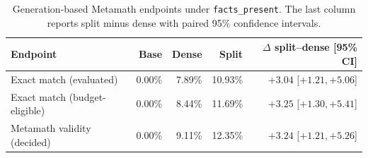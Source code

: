 \documentclass{article}
\begin{document}
\begin{table}[!htbp]
\centering
\scriptsize
\caption{Generation-based Metamath endpoints under \texttt{facts\_present}. The last column reports split minus dense with paired 95\% confidence intervals.}
\label{tab:p3-metamath}
\begin{tabular*}{\textwidth}{@{\extracolsep{\fill}}lrrrr}
\toprule
Endpoint & Base & Dense & Split & $\Delta$ split--dense [95\% CI] \\
\midrule
Exact match (evaluated)       & 0.00\% & 7.89\% & 10.93\% & $+3.04$ [$+1.21,+5.06$] \\
Exact match (budget-eligible) & 0.00\% & 8.44\% & 11.69\% & $+3.25$ [$+1.30,+5.41$] \\
Metamath validity (decided)   & 0.00\% & 9.11\% & 12.35\% & $+3.24$ [$+1.21,+5.26$] \\
\bottomrule
\end{tabular*}
\end{table}
\end{document}
